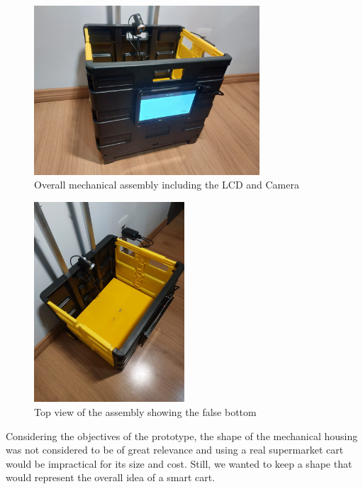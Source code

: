 \documentclass[openright]{normas-utf-tex} %
\begin{document}
\begin{figure}[H]
	\centering
	\includegraphics[width=0.75\textwidth]{./images/cart.jpeg}
	\caption[Overall mechanical assembly including the LCD and Camera]{Overall mechanical assembly including the LCD and Camera}
\end{figure}

\begin{figure}[H]
	\centering
	\includegraphics[width=0.5\textwidth]{./images/carttop.jpeg}
	\caption[Top view of the assembly showing the false bottom]{Top view of the assembly showing the false bottom}
\end{figure}

Considering the objectives of the prototype, the shape of the mechanical
housing was not considered to be of great relevance and using a real
supermarket cart would be impractical for its size and cost. Still, we wanted
to keep a shape that would represent the overall idea of a smart cart.
\end{document}
